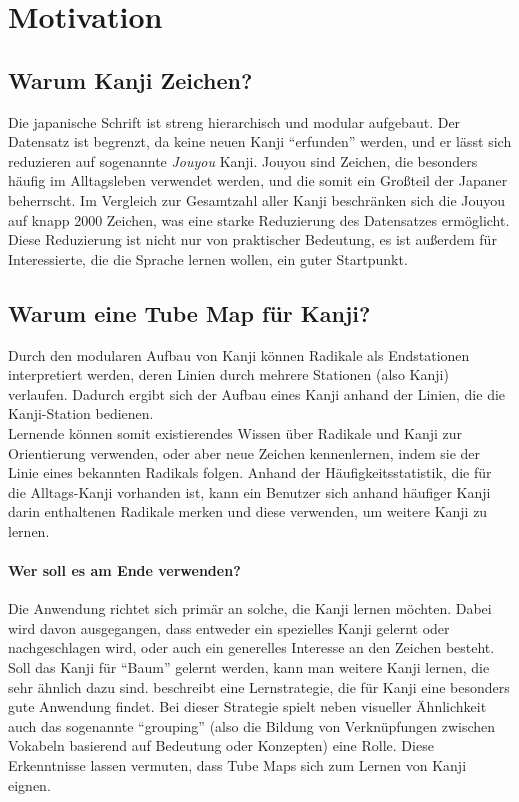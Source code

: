 \section{Motivation}
\subsection{Warum Kanji Zeichen?}
Die japanische Schrift ist streng hierarchisch und modular aufgebaut. Der Datensatz ist begrenzt, da keine neuen Kanji "`erfunden"' werden, und er lässt sich reduzieren auf sogenannte \emph{Jouyou} Kanji. Jouyou sind Zeichen, die besonders häufig im Alltagsleben verwendet werden, und die somit ein Großteil der Japaner beherrscht. Im Vergleich zur Gesamtzahl aller Kanji beschränken sich die Jouyou auf knapp 2000 Zeichen, was eine starke Reduzierung des Datensatzes ermöglicht.
Diese Reduzierung ist nicht nur von praktischer Bedeutung, es ist außerdem für Interessierte, die die Sprache lernen wollen, ein guter Startpunkt. 

\subsection{Warum eine Tube Map für Kanji?}
Durch den modularen Aufbau von Kanji können Radikale als Endstationen interpretiert werden, deren Linien durch mehrere Stationen (also Kanji) verlaufen. Dadurch ergibt sich der Aufbau eines Kanji anhand der Linien, die die Kanji-Station bedienen. \\
Lernende können somit existierendes Wissen über Radikale und Kanji zur Orientierung verwenden, oder aber neue Zeichen kennenlernen, indem sie der Linie eines bekannten Radikals folgen. Anhand der Häufigkeitsstatistik, die für die Alltags-Kanji vorhanden ist, kann ein Benutzer sich anhand häufiger Kanji darin enthaltenen Radikale merken und diese verwenden, um weitere Kanji zu lernen. 
\paragraph{Wer soll es am Ende verwenden?}
Die Anwendung richtet sich primär an solche, die Kanji lernen möchten. Dabei wird davon ausgegangen, dass entweder ein spezielles Kanji gelernt oder nachgeschlagen wird, oder auch ein generelles Interesse an den Zeichen besteht. Soll das Kanji für "`Baum"' gelernt werden, kann man weitere Kanji lernen, die sehr ähnlich dazu sind.  
\cite{kanjilearningjapanese10} beschreibt eine Lernstrategie, die für Kanji eine besonders gute Anwendung findet. Bei dieser Strategie spielt neben visueller Ähnlichkeit auch das sogenannte "`grouping"' (also die Bildung von Verknüpfungen zwischen Vokabeln basierend auf Bedeutung oder Konzepten) eine Rolle. Diese Erkenntnisse lassen vermuten, dass Tube Maps sich zum Lernen von Kanji eignen.
